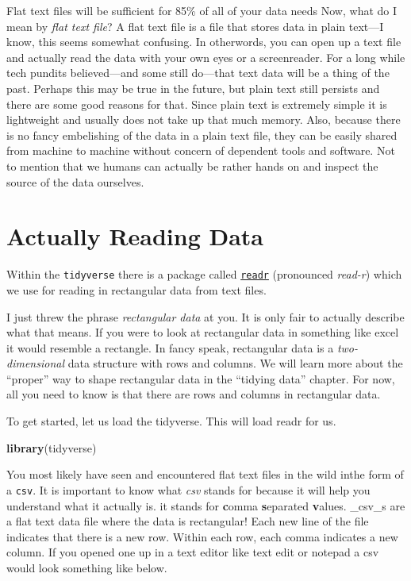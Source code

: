 \documentclass[
]{book}
\newenvironment{Shaded}{\begin{snugshade}}{\end{snugshade}}
\newcommand{\KeywordTok}[1]{\textcolor[rgb]{0.13,0.29,0.53}{\textbf{#1}}}
\newcommand{\NormalTok}[1]{#1}
\begin{document}
Flat text files will be sufficient for 85\% of all of your data needs Now, what do I mean by \emph{flat text file}? A flat text file is a file that stores data in plain text---I know, this seems somewhat confusing. In otherwords, you can open up a text file and actually read the data with your own eyes or a screenreader. For a long while tech pundits believed---and some still do---that text data will be a thing of the past. Perhaps this may be true in the future, but plain text still persists and there are some good reasons for that. Since plain text is extremely simple it is lightweight and usually does not take up that much memory. Also, because there is no fancy embelishing of the data in a plain text file, they can be easily shared from machine to machine without concern of dependent tools and software. Not to mention that we humans can actually be rather hands on and inspect the source of the data ourselves.

\hypertarget{actually-reading-data}{%
\section{Actually Reading Data}\label{actually-reading-data}}

Within the \texttt{tidyverse} there is a package called \href{https://readr.tidyverse.org}{\texttt{readr}} (pronounced \emph{read-r}) which we use for reading in rectangular data from text files.

I just threw the phrase \emph{rectangular data} at you. It is only fair to actually describe what that means. If you were to look at rectangular data in something like excel it would resemble a rectangle. In fancy speak, rectangular data is a \emph{two-dimensional} data structure with rows and columns. We will learn more about the ``proper'' way to shape rectangular data in the ``tidying data'' chapter. For now, all you need to know is that there are rows and columns in rectangular data.

To get started, let us load the tidyverse. This will load readr for us.

\begin{Shaded}
\begin{Highlighting}[]
\KeywordTok{library}\NormalTok{(tidyverse) }
\end{Highlighting}
\end{Shaded}

You most likely have seen and encountered flat text files in the wild inthe form of a \texttt{csv}. It is important to know what \emph{csv} stands for because it will help you understand what it actually is. it stands for \textbf{c}omma \textbf{s}eparated \textbf{v}alues. \_csv\_s are a flat text data file where the data is rectangular! Each new line of the file indicates that there is a new row. Within each row, each comma indicates a new column. If you opened one up in a text editor like text edit or notepad a csv would look something like below.
\end{document}
